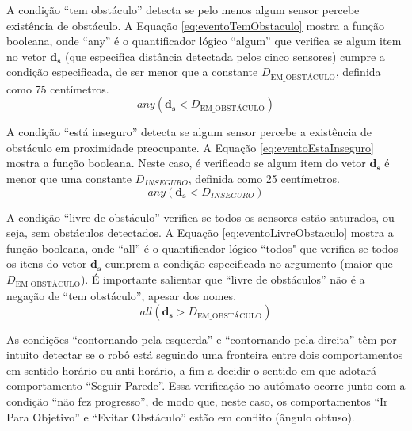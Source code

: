 		A condição ``tem obstáculo'' detecta se pelo menos algum sensor percebe existência de 
		obstáculo. A Equação \ref{eq:eventoTemObstaculo} mostra a função booleana, onde ``any''
		é o quantificador lógico ``algum'' que verifica se algum item no vetor $\mathbf{d_s}$ 
		(que especifica distância detectada pelos cinco sensores) cumpre a condição especificada, 
		de ser menor que a constante $D_{\text{EM\_OBSTÁCULO}}$, definida como 75 centímetros.
		\begin{equation}
			\label{eq:eventoTemObstaculo}
			any(\mathbf{d_s} < D_{\text{EM\_OBSTÁCULO}})
		\end{equation}
		
		A condição ``está inseguro'' detecta se algum sensor percebe a existência de obstáculo 
		em proximidade preocupante. A Equação \ref{eq:eventoEstaInseguro} mostra a função booleana.
		Neste caso, é verificado se algum item do vetor $\mathbf{d_s}$ é menor que uma constante 
		$D_{INSEGURO}$, definida como 25 centímetros.
		\begin{equation}
			\label{eq:eventoEstaInseguro}
			any(\mathbf{d_s} < D_{INSEGURO})
		\end{equation}
		
		A condição ``livre de obstáculo'' verifica se todos os sensores estão saturados, ou seja,
		sem obstáculos detectados. A Equação \ref{eq:eventoLivreObstaculo} mostra a função booleana,
		onde ``all'' é o quantificador lógico ``todos" que verifica se todos os itens do vetor 
		$\mathbf{d_s}$ cumprem a condição especificada no argumento (maior que 
		$D_{\text{EM\_OBSTÁCULO}}$). É importante salientar que ``livre de obstáculos'' não é 
		a negação de ``tem obstáculo'', apesar dos nomes. 
		\begin{equation}
			\label{eq:eventoLivreObstaculo}
			all(\mathbf{d_s} > D_{\text{EM\_OBSTÁCULO}})
		\end{equation}
				
		As condições ``contornando pela esquerda'' e ``contornando pela direita'' têm por intuito
		detectar se o robô está seguindo uma fronteira entre dois comportamentos em sentido 
		horário ou anti-horário, a fim a decidir o sentido em que adotará comportamento 
		``Seguir Parede''. Essa verificação no autômato ocorre junto com a condição ``não fez
		progresso'', de modo que, neste caso, os comportamentos ``Ir Para Objetivo'' e ``Evitar 
		Obstáculo'' estão em conflito (ângulo obtuso). 
		
